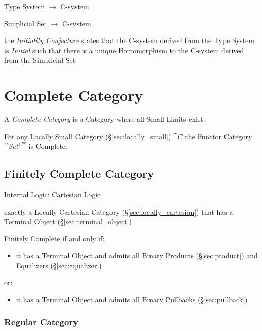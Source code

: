 Type System $\rightarrow$ C-system

Simplicial Set $\rightarrow$ C-system

the \emph{Initiality Conjecture} states that the C-system derived from
the Type System is \emph{Initial} such that there is a unique
Homomorphism to the C-system derived from the Simplicial Set



\section{Complete Category}\label{sec:complete_category}

A \emph{Complete Category} is a Category where all Small Limits exist.

For any Locally Small Category (\S\ref{sec:locally_small})
$\cat{C}$ the Functor Category $\cat{Set^{C^{op}}}$ is Complete.



\subsection{Finitely Complete Category}\label{sec:finitely_complete}

Internal Logic: Cartesian Logic %

exactly a Locally Cartesian Category (\S\ref{sec:locally_cartesian})
that has a Terminal Object (\S\ref{sec:terminal_object})

Finitely Complete if and only if:
\begin{itemize}
  \item it has a Terminal Object and admits all Binary Products
    (\S\ref{sec:product}) and Equalizers (\S\ref{sec:equalizer})
\end{itemize}
or:
\begin{itemize}
  \item it has a Terminal Object and admits all Binary Pullbacks
    (\S\ref{sec:pullback})
\end{itemize}



\subsubsection{Regular Category}\label{sec:regular_category}

